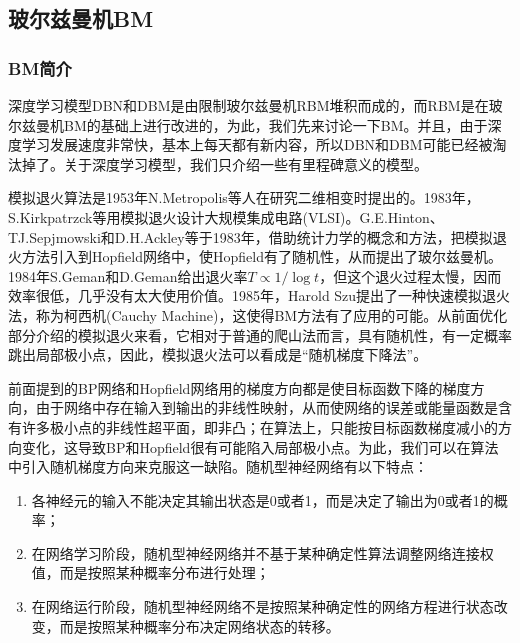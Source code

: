     \subsection{玻尔兹曼机BM}
        \subsubsection{BM简介}
            \par
            深度学习模型DBN和DBM是由限制玻尔兹曼机RBM堆积而成的，而RBM是在玻尔兹曼机BM的基础上进行改进的，为此，我们先来讨论一下BM。并且，由于深度学习发展速度非常快，基本上每天都有新内容，所以DBN和DBM可能已经被淘汰掉了。关于深度学习模型，我们只介绍一些有里程碑意义的模型。
            \par
            模拟退火算法是1953年N.Metropolis等人在研究二维相变时提出的。1983年，S.Kirkpatrzck等用模拟退火设计大规模集成电路(VLSI)。G.E.Hinton、TJ.Sepjmowski和D.H.Ackley等于1983年，借助统计力学的概念和方法，把模拟退火方法引入到Hopfield网络中，使Hopfield有了随机性，从而提出了玻尔兹曼机。1984年S.Geman和D.Geman给出退火率$T \propto 1/\log t$，但这个退火过程太慢，因而效率很低，几乎没有太大使用价值。1985年，Harold Szu提出了一种快速模拟退火法，称为柯西机(Cauchy Machine)，这使得BM方法有了应用的可能。从前面优化部分介绍的模拟退火来看，它相对于普通的爬山法而言，具有随机性，有一定概率跳出局部极小点，因此，模拟退火法可以看成是“随机梯度下降法”。
            \par
            前面提到的BP网络和Hopfield网络用的梯度方向都是使目标函数下降的梯度方向，由于网络中存在输入到输出的非线性映射，从而使网络的误差或能量函数是含有许多极小点的非线性超平面，即非凸；在算法上，只能按目标函数梯度减小的方向变化，这导致BP和Hopfield很有可能陷入局部极小点。为此，我们可以在算法中引入随机梯度方向来克服这一缺陷。随机型神经网络有以下特点：
            \begin{enumerate}
            \item 各神经元的输入不能决定其输出状态是0或者1，而是决定了输出为0或者1的概率；
            \item 在网络学习阶段，随机型神经网络并不基于某种确定性算法调整网络连接权值，而是按照某种概率分布进行处理；
            \item 在网络运行阶段，随机型神经网络不是按照某种确定性的网络方程进行状态改变，而是按照某种概率分布决定网络状态的转移。
            \end{enumerate}
